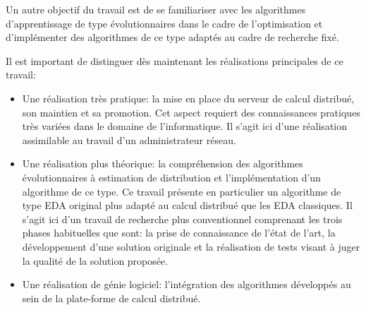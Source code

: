 \documentclass[a4paper, 11pt]{report}
\begin{document}
Un autre objectif du travail est de se familiariser avec les algorithmes d'apprentissage de type évolutionnaires dans le cadre de l'optimisation et d'implémenter des algorithmes de ce type adaptés au cadre de recherche fixé.

Il est important de distinguer dès maintenant les réalisations principales de ce travail: %
\begin{itemize}
\item Une réalisation très pratique: la mise en place du serveur de calcul distribué, son maintien et sa promotion. Cet aspect requiert des connaissances pratiques très variées dans le domaine de l'informatique. Il s'agit ici d'une réalisation assimilable au travail d'un administrateur réseau.
\item Une réalisation plus théorique: la compréhension des algorithmes évolutionnaires à estimation de distribution et l'implémentation d'un algorithme de ce type. Ce travail présente en particulier un algorithme de type EDA original plus adapté au calcul distribué que les EDA classiques. %
Il s'agit ici d'un travail de recherche plus conventionnel comprenant les trois phases habituelles que sont: la prise de connaissance de l'état de l'art, la développement d'une solution originale et la réalisation de tests visant à juger la qualité de la solution proposée.
\item Une réalisation de génie logiciel: l'intégration des algorithmes développés au sein de la plate-forme de calcul distribué. 
\end{itemize}




%
\end{document}
